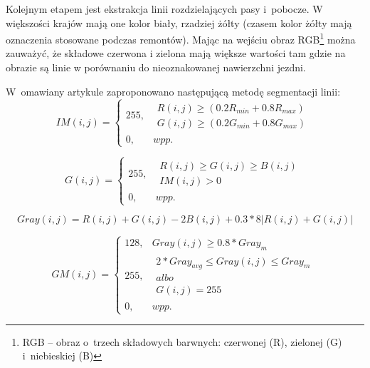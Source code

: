 Kolejnym etapem jest ekstrakcja linii rozdzielających pasy i~pobocze. 
W większości krajów mają one kolor biały, rzadziej żółty (czasem kolor żółty mają oznaczenia stosowane podczas remontów). 
Mając na wejściu obraz RGB\footnote{RGB -- obraz o~trzech składowych barwnych: czerwonej (R), zielonej (G) i~niebieskiej (B)} można zauważyć, że składowe czerwona i zielona mają większe wartości tam gdzie na obrazie są linie w porównaniu do nieoznakowanej nawierzchni jezdni. 

W~omawiany artykule zaproponowano następującą metodę segmentacji linii:
\begin{equation}
\label{eq:IMij}
IM(i,j)=\left\{\begin{matrix}
255, & \begin{matrix}
R(i,j)\geq (0.2R_{min}+0.8R_{max})\\ 
G(i,j)\geq (0.2G_{min}+0.8G_{max})
\end{matrix}\\ 
0, & wpp.
\end{matrix}\right.
\end{equation}

\begin{equation}
\label{eq:Gij}
G(i,j)=\left\{\begin{matrix}
255, & \begin{matrix}
R(i,j)\geq G(i,j) \geq B(i,j)\\ 
IM(i,j)>0
\end{matrix}\\ 
0, & wpp.
\end{matrix}\right.
\end{equation}

\begin{equation}
\label{eq:Gray}
Gray(i,j)=R(i,j)+G(i,j)-2B(i,j)+0.3*8|R(i,j)+G(i,j)|
\end{equation}

\begin{equation}
\label{eq:GMij}
GM(i,j)=\left\{\begin{matrix}
128, &  Gray(i,j)\geq 0.8*Gray_{m} \\ 
255, & \begin{matrix}
2*Gray_{avg} \leq Gray(i, j) \leq Gray_{m}\\albo\\ 
G(i,j)=255
\end{matrix} \\ 
0,   & wpp.
\end{matrix}\right.
\end{equation}

